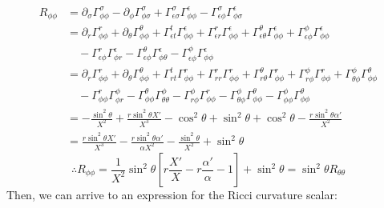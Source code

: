 \documentclass[12pt]{report}
\begin{document}
	\begin{align*}
		R_{\phi\phi} &= \partial_{\sigma}\Gamma^{\sigma}_{\phi\phi} - \partial_{\phi}\Gamma^{\sigma}_{\phi\sigma} + \Gamma^{\sigma}_{\epsilon\sigma}\Gamma^{\epsilon}_{\phi\phi} - \Gamma^{\sigma}_{\epsilon\phi}\Gamma^{\epsilon}_{\phi\sigma} \\
		&= \partial_r\Gamma^r_{\phi\phi} + \partial_{\theta}\Gamma^{\theta}_{\phi\phi} + \Gamma^t_{\epsilon t}\Gamma^{\epsilon}_{\phi\phi} + \Gamma^r_{\epsilon r}\Gamma^{\epsilon}_{\phi\phi} + \Gamma^{\theta}_{\epsilon\theta}\Gamma^{\epsilon}_{\phi\phi} + \Gamma^{\phi}_{\epsilon\phi}\Gamma^{\epsilon}_{\phi\phi} \\
		&\quad - \Gamma^r_{\epsilon\phi}\Gamma^{\epsilon}_{\phi r} - \Gamma^{\theta}_{\epsilon\phi}\Gamma^{\epsilon}_{\phi\theta} - \Gamma^{\phi}_{\epsilon\phi}\Gamma^{\epsilon}_{\phi\phi} \\
		&= \partial_r\Gamma^r_{\phi\phi} + \partial_{\theta}\Gamma^{\theta}_{\phi\phi} + \Gamma^t_{rt}\Gamma^r_{\phi\phi} + \Gamma^r_{rr}\Gamma^r_{\phi\phi} + \Gamma^{\theta}_{r\theta}\Gamma^r_{\phi\phi} + \Gamma^{\phi}_{r\phi}\Gamma^r_{\phi\phi} + \Gamma^{\phi}_{\theta\phi}\Gamma^{\theta}_{\phi\phi} \\
		&\quad - \Gamma^r_{\phi\phi}\Gamma^{\phi}_{\phi r} - \Gamma^{\theta}_{\phi\phi}\Gamma^{\phi}_{\theta\theta} - \Gamma^{\phi}_{r\phi}\Gamma^r_{\phi\phi} - \Gamma^{\phi}_{\theta\phi}\Gamma^{\theta}_{\phi\phi} - \Gamma^{\phi}_{\phi\phi}\Gamma^{\theta}_{\phi\phi} \\
		&= -\frac{\sin^2\theta}{X^2} + \frac{r\sin^2\theta X'}{X^3} - \cos^2\theta + \sin^2\theta + \cos^2\theta - \frac{r\sin^2\theta\alpha'}{X^2} \\
		&= \frac{r\sin^2\theta X'}{X^3} - \frac{r\sin^2\theta \alpha'}{\alpha X^2} - \frac{\sin^2\theta}{X^2} + \sin^2\theta
	\end{align*}
	\begin{equation}
		\therefore \boxed{R_{\phi\phi} = \frac{1}{X^2}\sin^2\theta\left[r\frac{X'}{X} - r\frac{\alpha'}{\alpha} - 1\right] + \sin^2\theta = \sin^2\theta R_{\theta\theta}}
	\end{equation}
	\newpage
	Then, we can arrive to an expression for the Ricci curvature scalar:
	
\end{document}
